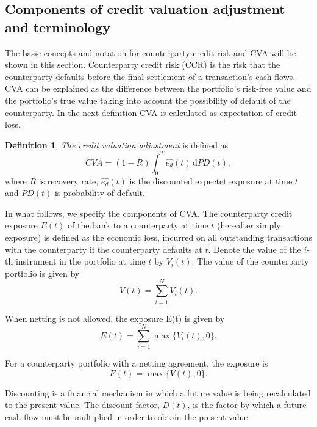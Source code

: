 \documentclass{amsart}
\theoremstyle{definition}\newtheorem{definition}[theorem]{Definition}
\theoremstyle{remark}\newtheorem{remark}[theorem]{Remark}
\newcommand{\dif}{\,\mathrm{d}}
\begin{document}
\subsection{Components of credit valuation adjustment and terminology}
The basic concepts and notation for counterparty credit risk and CVA will be shown in this section.
Counterparty credit risk (CCR) is the risk that the counterparty defaults before the final settlement of a transaction's cash flows.
CVA can be explained as the difference between the portfolio’s risk-free value and the portfolio’s true value taking into account the possibility of default of the counterparty.
In the next definition CVA is calculated as expectation of credit loss.
\begin{definition}
 \textit{The credit valuation adjustment} is defined as
 \begin{equation}
 CVA=(1-R)\int_{0}^T \hat{e_d}(t)\dif PD(t),
 \label{CVA}
\end{equation}
  where $R$ is recovery rate, $\hat{e_d}(t)$ is the discounted expectet exposure at time $t$ and $PD(t)$ is probability of default.
\end{definition}
In what follows, we specify the components of CVA. 
The counterparty credit exposure $E(t)$ of the bank to a counterparty at time $t$ (hereafter simply exposure) is defined as the economic loss, incurred on all outstanding transactions with the counterparty if the counterparty defaults at $t$.
Denote the value of the $i$-th instrument in the portfolio at time $t$ by  $V_i(t)$. 
The value of the counterparty portfolio is given by 
\begin{equation}
V(t)=\sum_{i=1}^N V_i(t).
\end{equation}

When netting is not allowed, the exposure E(t) is given by
\begin{equation}
E(t)=\sum_{i=1}^N\max\{V_i(t),0\}.
\end{equation}

For a counterparty portfolio with a netting agreement, the exposure is
\begin{equation}
E(t)=\max\{V(t),0\}.
\end{equation}

Discounting is a financial mechanism in which a future value is being recalculated to the present value.
The discount factor, $D(t)$, is the factor by which a future cash flow must be multiplied in order to obtain the present value.
\end{document}
